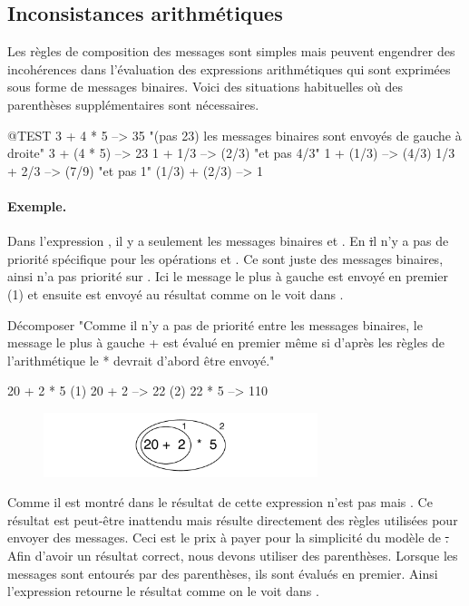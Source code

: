 \documentclass[a4paper,10pt,twoside]{book}
\begin{document}
\subsection{Inconsistances arithm\'etiques}
Les r\`egles de composition des messages sont simples mais peuvent engendrer des incoh\'erences dans l'\'evaluation des expressions arithm\'etiques qui sont exprim\'ees sous forme de messages binaires. Voici des situations habituelles o\`u des parenth\`eses suppl\'ementaires sont n\'ecessaires.

\begin{code}{@TEST}
3 + 4 * 5      --> 35    "(pas 23)  les messages binaires sont envoy\'es de gauche \`a droite"
3 + (4 * 5)    --> 23
1 + 1/3         --> (2/3)    "et pas 4/3"
1 + (1/3)       --> (4/3)
1/3 + 2/3       --> (7/9)    "et pas 1"
(1/3) + (2/3)  --> 1
\end{code}

\paragraph{Exemple.} 
Dans l'expression , il y a seulement les messages binaires \ct{+} et \ct{*}. En \st il n'y a pas de priorit\'e sp\'ecifique pour les op\'erations \ct{+} et \ct{*}. Ce sont juste des messages binaires, ainsi \ct{*} n'a pas priorit\'e sur \ct{+}. Ici le message le plus \`a gauche \ct{+} est envoy\'e en premier (1) et ensuite \ct{*} est envoy\'e au r\'esultat comme on le voit dans .  

\begin{example}[binaryMessages1]{D\'ecomposer }{}
"Comme il n'y a pas de priorit\'e entre les messages binaires, le message le plus \`a gauche + est \'evalu\'e en premier m\^eme si d'apr\`es les r\`egles de l'arithm\'etique le * devrait d'abord \^etre envoy\'e."

      20 + 2 * 5 
(1)  20 + 2 --> 22
(2)  22       * 5 --> 110
\end{example}

\begin{figure}
\begin{center}\includegraphics[width=8cm]{ucompoNoBracketPar}\end{center}
\end{figure}
\noindent
Comme il est montr\'e dans  le r\'esultat de cette expression n'est pas  mais . Ce r\'esultat est peut-\^etre inattendu mais r\'esulte directement des r\`egles utilis\'ees pour envoyer des messages. Ceci est le prix \`a payer pour la simplicit\'e du mod\`ele de \st. Afin d'avoir un r\'esultat correct, nous devons utiliser des parenth\`eses. Lorsque les messages sont entour\'es par des parenth\`eses, ils sont \'evalu\'es en premier. Ainsi l'expression  retourne le r\'esultat comme on le voit dans .
\end{document}
